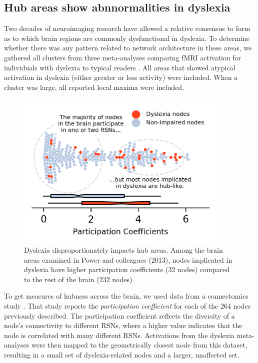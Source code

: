 \subsection{Hub areas show abnnormalities in dyslexia}
Two decades of neuroimaging research have allowed a relative consensus to form as to which brain regions are commonly dysfunctional in dyslexia. To determine whether there was any pattern related to network architecture in these areas, we gathered all clusters from three meta-analyses comparing fMRI activation for individuals with dyslexia to typical readers \citep{Maisog2008, Richlan2009, Paulesu2014}. All areas that showed atypical activation in dyslexia (either greater or less activity) were included. When a cluster was large, all reported local maxima were included. 

\begin{figure}[t]
\centering
\includegraphics[height=3in]{images/ch1-dyslexia-hubs.png}
    \caption[Dyslexia disproportionately impacts hub areas.]{Dyslexia disproportionately impacts hub areas. Among the brain areas examined in Power and colleagues (2013), nodes implicated in dyslexia have higher participation coefficients (32 nodes) compared to the rest of the brain (232 nodes).}
\label{fig:ch1-dyslexia-hubs}
\end{figure}

To get measures of hubness across the brain, we used data from a connectomics study \citep{Power2013}. That study reports the \textit{participation coefficient} for each of the 264 nodes previously described. The participation coefficient reflects the diversity of a node's connectivity to different RSNs, where a higher value indicates that the node is correlated with many different RSNs. Activations from the dyslexia meta-analyses were then mapped to the geometrically closest node from this dataset, resulting in a small set of dyslexia-related nodes and a larger, unaffected set.

